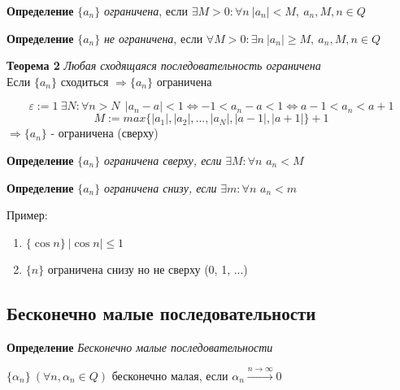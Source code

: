 \documentclass[12pt, paper]{article}
\newcommand{\eps}{\varepsilon}
\begin{document}
\begin{tcolorbox}
\textbf{Определение}
$\{a_n\}$  \textit{ограничена}, если $\exists M>0: \forall n\ |a_n|<M,\ a_n, M, n \in Q$
\end{tcolorbox}

\begin{tcolorbox}
\textbf{Определение}
$\{a_n\}$  \textit{не ограничена}, если $\forall M>0: \exists n\ |a_n|\geq M,\ a_n, M, n \in Q$ 
\end{tcolorbox}

\begin{tcolorbox}
\textbf{Теорема 2} \textit{Любая сходящаяся последовательность ограничена} \\
Если $\{a_n\}$ сходиться $\Rightarrow \{a_n\}$ ограничена
\end{tcolorbox}

\begin{tcolorbox}[title=Доказательство Т2, breakable]
\[\eps := 1\ \exists N: \forall n > N\ \ |a_n-a| < 1 \Leftrightarrow -1<a_n-a<1 \Leftrightarrow a-1 < a_n < a+1  \]
\[ M:= max\{ |a_1|, |a_2|, ..., |a_N|, |a-1|, |a+1| \} + 1\]
$\Rightarrow \{a_n\}$ - ограничена (сверху)
\end{tcolorbox}

\begin{tcolorbox}
\textbf{Определение}
$\{a_n\}$  \textit{ограничена сверху, если} $\exists M: \forall n$ $a_n < M$
\end{tcolorbox}

\begin{tcolorbox}
\textbf{Определение}
$\{a_n\}$  \textit{ограничена снизу, если} $\exists m: \forall n$ $a_n < m$
\end{tcolorbox}

Пример:
\begin{enumerate}
    \item $\{\cos n\}\ |\cos n| \leq 1$
    \item $\{n\}$ ограничена снизу но не сверху (0, 1, ...)
\end{enumerate}

\newpage
\subsection{Бесконечно малые последовательности}

\begin{tcolorbox}
\textbf{Определение}
\textit{Бесконечно малые последовательности}
\begin{center}
    $\{\alpha_n\}\ (\forall n, \alpha_n \in Q)$ бесконечно малая, если $\alpha_n 
    \xrightarrow{n\rightarrow \infty} 0$    
\end{center}
\end{tcolorbox}
\end{document}
